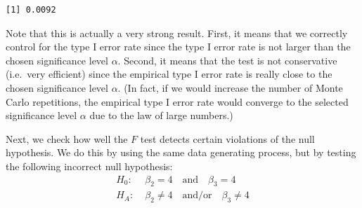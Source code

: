 \documentclass[
  letterpaper,
  DIV=11,
  numbers=noendperiod]{scrreprt}
\newenvironment{Shaded}{\begin{snugshade}}{\end{snugshade}}
\newcommand{\AttributeTok}[1]{\textcolor[rgb]{0.40,0.45,0.13}{#1}}
\newcommand{\CommentTok}[1]{\textcolor[rgb]{0.37,0.37,0.37}{#1}}
\newcommand{\ConstantTok}[1]{\textcolor[rgb]{0.56,0.35,0.01}{#1}}
\newcommand{\ControlFlowTok}[1]{\textcolor[rgb]{0.00,0.23,0.31}{#1}}
\newcommand{\DecValTok}[1]{\textcolor[rgb]{0.68,0.00,0.00}{#1}}
\newcommand{\DocumentationTok}[1]{\textcolor[rgb]{0.37,0.37,0.37}{\textit{#1}}}
\newcommand{\FloatTok}[1]{\textcolor[rgb]{0.68,0.00,0.00}{#1}}
\newcommand{\FunctionTok}[1]{\textcolor[rgb]{0.28,0.35,0.67}{#1}}
\newcommand{\NormalTok}[1]{\textcolor[rgb]{0.00,0.23,0.31}{#1}}
\newcommand{\OtherTok}[1]{\textcolor[rgb]{0.00,0.23,0.31}{#1}}
\newcommand{\SpecialCharTok}[1]{\textcolor[rgb]{0.37,0.37,0.37}{#1}}
\newcommand{\StringTok}[1]{\textcolor[rgb]{0.13,0.47,0.30}{#1}}
\theoremstyle{definition}
\theoremstyle{plain}
\theoremstyle{plain}
\theoremstyle{remark}
\begin{document}
\begin{verbatim}
[1] 0.0092
\end{verbatim}

Note that this is actually a very strong result. First, it means that we
correctly control for the type I error rate since the type I error rate
is not larger than the chosen significance level \(\alpha\). Second, it
means that the test is not conservative (i.e.~very efficient) since the
empirical type I error rate is really close to the chosen significance
level \(\alpha\). (In fact, if we would increase the number of Monte
Carlo repetitions, the empirical type I error rate would converge to the
selected significance level \(\alpha\) due to the law of large numbers.)

Next, we check how well the \(F\) test detects certain violations of the
null hypothesis. We do this by using the same data generating process,
but by testing the following incorrect null hypothesis: \begin{align*}
H_0:\;&\beta_2=4\quad\text{and}\quad\beta_3=4\\
H_A:\;&\beta_2\neq 4\quad\text{and/or}\quad\beta_3\neq 4
\end{align*}

\begin{Shaded}
\end{Shaded}
\end{document}
